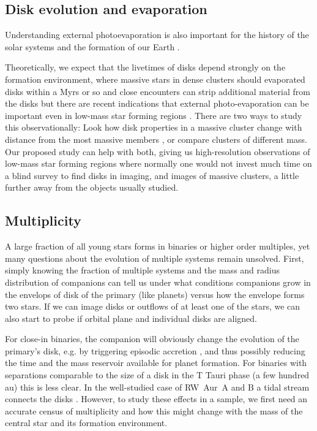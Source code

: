 \documentclass[12pt]{article}
\begin{document}
\subsection{Disk evolution and evaporation}

Understanding external photoevaporation is also important for the history of the solar systems and the formation of our Earth \citep{2015ApJ...815..112K}.

Theoretically, we expect that the livetimes of disks depend strongly on the formation environment, where massive stars in dense clusters should evaporated disks within a Myrs or so and close encounters can strip additional material from the disks \citep[e.g.][]{2004ApJ...611..360A,2019MNRAS.485.1489W,2019arXiv190211094N}but there are recent indications that external photo-evaporation can be important even in low-mass star forming regions \citep{2017MNRAS.468L.108H}.
There are two ways to study this observationally: Look how disk properties in a massive cluster change with distance from the most massive members \citep{2018ApJ...860...77E}, or compare clusters of different mass. Our proposed study can help with both, giving us high-resolution observations of low-mass star forming regions where normally one would not invest much time on a blind survey to find disks in imaging, and images of massive clusters, a little further away from the objects usually studied.




\subsection{Multiplicity}
A large fraction of all young stars forms in binaries or higher order multiples, yet many questions about the evolution of multiple systems remain unsolved. First, simply knowing the fraction of multiple systems and the mass and radius distribution of companions can tell us under what conditions companions grow in the envelops of disk of the primary (like planets) versus how the envelope forms two stars. If we can image disks or outflows of at least one of the stars, we can also start to probe if orbital plane and individual disks are aligned.

For close-in binaries, the companion will obviously change the evolution of the primary's disk, e.g. by triggering episodic accretion \citep{2013ApJ...766...62G}, and thus possibly reducing the time and the mass reservoir available for planet formation. For binaries with separations comparable to the size of a disk in the T Tauri phase (a few hundred au) this is less clear. In the well-studied case of RW~Aur~A and B a tidal stream connects the disks \citep{2006A&A...452..897C}. However, to study these effects in a sample, we first need an accurate census of multiplicity and how this might change with the mass of the central star and its formation environment.
\end{document}
